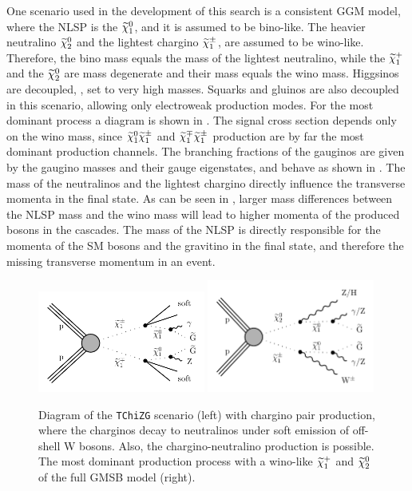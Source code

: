 One scenario used in the development of this search is a consistent GGM model, where the NLSP is the $\widetilde{\chi}^{0}_{1}$, and it is assumed to be bino-like. The heavier neutralino $\widetilde{\chi}^{0}_{2}$ and the lightest chargino $\widetilde{\chi}^\pm_{1}$, are assumed to be wino-like. Therefore, the bino mass equals the mass of the lightest neutralino, while the $\widetilde{\chi}^{+}_{1}$ and the $\widetilde{\chi}^{0}_{2}$ are mass degenerate and their mass equals the wino mass. Higgsinos are decoupled, \ie, set to very high masses. Squarks and gluinos are also decoupled in this scenario, allowing only electroweak production modes. For the most dominant process a diagram is shown in . The signal cross section depends only on the wino mass, since $\widetilde{\chi}^{0}_{1}\widetilde{\chi}^\pm_{1}$ and $\widetilde{\chi}^\mp_{1}\widetilde{\chi}^\pm_{1}$ production are by far the most dominant production channels. The branching fractions of the gauginos are given by the gaugino masses and their gauge eigenstates, and behave as shown in . The mass of the neutralinos and the lightest chargino directly influence the transverse momenta in the final state. As can be seen in , larger mass differences between the NLSP mass and the wino mass will lead to higher momenta of the produced bosons in the cascades. The mass of the NLSP is directly responsible for the momenta of the SM bosons and the gravitino in the final state, and therefore the missing transverse momentum in an event.
\begin{figure}[tbp]
 \centering
 \includegraphics[width=0.49\textwidth]{figures/signal/TChiNG}
 \includegraphics[width=0.49\textwidth]{figures/signal/gmsb}
 \caption{Diagram of the \texttt{TChiZG} scenario (left) with chargino pair production, where the charginos decay to neutralinos under soft emission of off-shell W bosons. Also, the chargino-neutralino production is possible. The most dominant production process with a wino-like $\widetilde{\chi}^{+}_{1}$ and $\widetilde{\chi}^{0}_{2}$ of the full GMSB model (right).}
 \label{fig:ewkSMS}
\end{figure}
